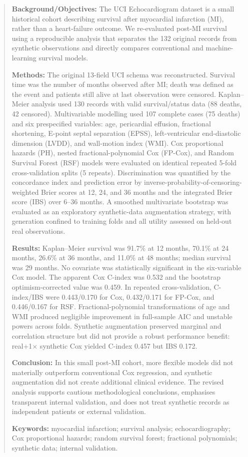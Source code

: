 \documentclass[a4paper,12pt]{article}
\begin{document}
\begin{abstract}
\textbf{Background/Objectives:} The UCI Echocardiogram dataset is a small historical cohort describing survival after myocardial infarction (MI), rather than a heart-failure outcome. We re-evaluated post-MI survival using a reproducible analysis that separates the 132 original records from synthetic observations and directly compares conventional and machine-learning survival models.

\textbf{Methods:} The original 13-field UCI schema was reconstructed. Survival time was the number of months observed after MI; death was defined as the event and patients still alive at last observation were censored. Kaplan--Meier analysis used 130 records with valid survival/status data (88 deaths, 42 censored). Multivariable modelling used 107 complete cases (75 deaths) and six prespecified variables: age, pericardial effusion, fractional shortening, E-point septal separation (EPSS), left-ventricular end-diastolic dimension (LVDD), and wall-motion index (WMI). Cox proportional hazards (PH), nested fractional-polynomial Cox (FP-Cox), and Random Survival Forest (RSF) models were evaluated on identical repeated 5-fold cross-validation splits (5 repeats). Discrimination was quantified by the concordance index and prediction error by inverse-probability-of-censoring-weighted Brier scores at 12, 24, and 36 months and the integrated Brier score (IBS) over 6--36 months. A smoothed multivariate bootstrap was evaluated as an exploratory synthetic-data augmentation strategy, with generation confined to training folds and all utility assessed on held-out real observations.

\textbf{Results:} Kaplan--Meier survival was 91.7\% at 12 months, 70.1\% at 24 months, 26.6\% at 36 months, and 11.0\% at 48 months; median survival was 29 months. No covariate was statistically significant in the six-variable Cox model. The apparent Cox C-index was 0.532 and the bootstrap optimism-corrected value was 0.459. In repeated cross-validation, C-index/IBS were 0.443/0.170 for Cox, 0.432/0.171 for FP-Cox, and 0.446/0.167 for RSF. Fractional-polynomial transformations of age and WMI produced negligible improvement in full-sample AIC and unstable powers across folds. Synthetic augmentation preserved marginal and correlation structure but did not provide a robust performance benefit: real+1$\times$ synthetic Cox yielded C-index 0.457 but IBS 0.172.

\textbf{Conclusion:} In this small post-MI cohort, more flexible models did not materially outperform conventional Cox regression, and synthetic augmentation did not create additional clinical evidence. The revised analysis supports cautious methodological conclusions, emphasises transparent internal validation, and does not treat synthetic records as independent patients or external validation.

\textbf{Keywords:} myocardial infarction; survival analysis; echocardiography; Cox proportional hazards; random survival forest; fractional polynomials; synthetic data; internal validation.
\end{abstract}
\end{document}
